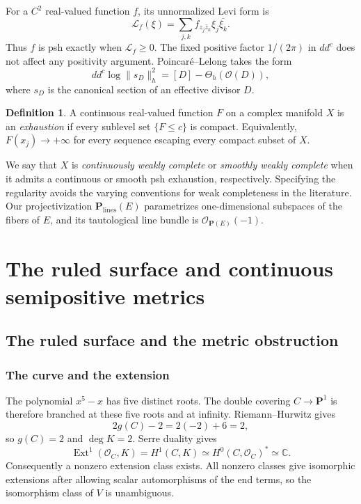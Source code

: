 \documentclass[11pt]{amsart}
\theoremstyle{definition}
\newtheorem{definition}[theorem]{Definition}
\theoremstyle{remark}
\numberwithin{equation}{section}
\newcommand{\C}{\mathbb C}
\newcommand{\PP}{\mathbf P}
\newcommand{\OO}{\mathcal O}
\newcommand{\ddc}{dd^c}
\newcommand{\Levi}{\mathcal L}
\begin{document}
For a $C^2$ real-valued function $f$, its unnormalized Levi form is
\[
 \Levi_f(\xi)=\sum_{j,k}f_{z_j\bar z_k}\xi_j\overline{\xi_k}.
\]
Thus $f$ is psh exactly when $\Levi_f\ge0$. The fixed positive factor
$1/(2\pi)$ in $\ddc$ does not affect any positivity argument.
Poincar\'e--Lelong takes the form
\begin{equation}\label{eq:PL}
 \ddc\log\|s_D\|_h^2=[D]-\Theta_h(\OO(D)),
\end{equation}
where $s_D$ is the canonical section of an effective divisor $D$.

\begin{definition}
A continuous real-valued function $F$ on a complex manifold $X$ is an
\emph{exhaustion} if every sublevel set $\{F\le c\}$ is compact.
Equivalently, $F(x_j)\to+\infty$ for every sequence escaping every
compact subset of $X$.
\end{definition}

We say that $X$ is \emph{continuously weakly complete} or
\emph{smoothly weakly complete} when it admits a continuous or smooth
psh exhaustion, respectively. Specifying the regularity avoids the
varying conventions for weak completeness in the literature.
Our projectivization $\PP_{\mathrm{lines}}(E)$ parametrizes
one-dimensional subspaces of the fibers of $E$, and its tautological
line bundle is $\OO_{\PP(E)}(-1)$.

\section{The ruled surface and continuous semipositive metrics}\label{sec:metrics}

\subsection{The ruled surface and the metric obstruction}\label{sec:ruled}

\subsubsection{The curve and the extension}

The polynomial $x^5-x$ has five distinct roots. The double covering
$C\to\PP^1$ is therefore branched at these five roots and at infinity.
Riemann--Hurwitz gives
\[
 2g(C)-2=2(-2)+6=2,
\]
so $g(C)=2$ and $\deg K=2$. Serre duality gives
\[
 \operatorname{Ext}^1(\OO_C,K)=H^1(C,K)
 \simeq H^0(C,\OO_C)^*\simeq\C.
\]
Consequently a nonzero extension class exists. All nonzero classes give
isomorphic extensions after allowing scalar automorphisms of the end
terms, so the isomorphism class of $V$ is unambiguous.
\end{document}
